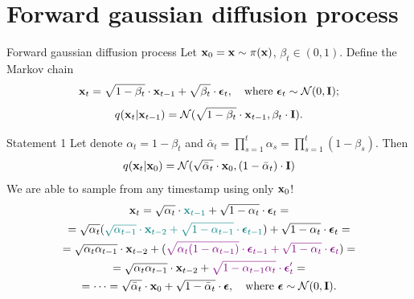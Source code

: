 \section{Forward gaussian diffusion process}
\begin{frame}{Forward gaussian diffusion process}
	Let $\mathbf{x}_0 = \mathbf{x} \sim \pi(\mathbf{x})$, $\beta_t \in (0, 1)$. Define the Markov chain
	\[
		\mathbf{x}_t = \sqrt{1 - \beta_t} \cdot \mathbf{x}_{t - 1} + \sqrt{\beta_t} \cdot \boldsymbol{\epsilon}_t, \quad \text{where }\boldsymbol{\epsilon}_t \sim \mathcal{N}(0, \mathbf{I});
	\]
	\[
		q(\mathbf{x}_t | \mathbf{x}_{t-1}) = \mathcal{N}(\sqrt{1 - \beta_t} \cdot \mathbf{x}_{t-1}, \beta_t \cdot \mathbf{I}).
	\]
	\vspace{-0.5cm}
	\begin{block}{Statement 1}
		Let denote $\alpha_t = 1 - \beta_t$ and $\bar{\alpha}_t = \prod_{s=1}^t \alpha_s = \prod_{s=1}^t (1 - \beta_s)$. Then
		\[
			q(\mathbf{x}_t | \mathbf{x}_0) = \mathcal{N}(\sqrt{\bar{\alpha}_t} \cdot \mathbf{x}_0, (1 - \bar{\alpha}_t) \cdot \mathbf{I})
		\]
		We are able to sample from any timestamp using only $\mathbf{x}_0$!
		\vspace{-0.2cm}
		{\small
		\begin{multline*}
			\mathbf{x}_t = \sqrt{\alpha_t} \cdot {\color{teal}\mathbf{x}_{t-1}} + \sqrt{1 - \alpha_t} \cdot \boldsymbol{\epsilon}_t = \\
			= \sqrt{\alpha_t} ({\color{teal} \sqrt{\alpha_{t-1}} \cdot \mathbf{x}_{t-2} + \sqrt{1 - \alpha_{t-1}} \cdot  \boldsymbol{\epsilon}_{t-1}}) + \sqrt{1 - \alpha_t} \cdot \boldsymbol{\epsilon}_t = \\
			= \sqrt{\alpha_t \alpha_{t-1}} \cdot \mathbf{x}_{t-2} + ( {\color{violet}\sqrt{\alpha_t (1 - \alpha_{t-1})} \cdot  \boldsymbol{\epsilon}_{t-1} + \sqrt{1 - \alpha_t} \cdot \boldsymbol{\epsilon}_t}) = \\
			= \sqrt{\alpha_t \alpha_{t-1}} \cdot \mathbf{x}_{t-2} + {\color{violet}\sqrt{1 - \alpha_{t-1} \alpha_t} \cdot \boldsymbol{\epsilon}'_t} = \\
			 = \dots = \sqrt{\bar{\alpha}_t} \cdot \mathbf{x}_{0} + \sqrt{1 - \bar{\alpha}_t} \cdot \boldsymbol{\epsilon}, \quad \text{where } \boldsymbol{\epsilon} \sim \mathcal{N}(0, \mathbf{I}).
		\end{multline*}
		}
	\end{block}
 \end{frame}

